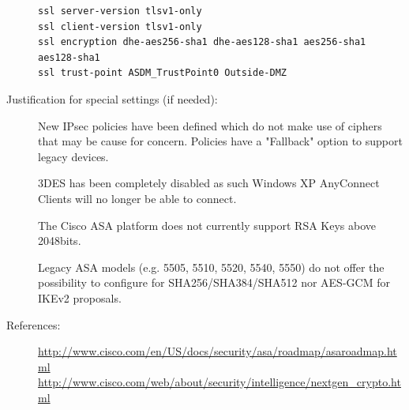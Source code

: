 \begin{description}
\begin{lstlisting}[breaklines]
ssl server-version tlsv1-only
ssl client-version tlsv1-only
ssl encryption dhe-aes256-sha1 dhe-aes128-sha1 aes256-sha1 aes128-sha1
ssl trust-point ASDM_TrustPoint0 Outside-DMZ
\end{lstlisting}

\item[Justification for special settings (if needed):] \mbox{}
New IPsec policies have been defined which do not make use of ciphers that may be cause for concern. Policies have a "Fallback" option to support legacy devices.

3DES has been completely disabled as such Windows XP AnyConnect Clients will no longer be able to connect.

The Cisco ASA platform does not currently support RSA Keys above 2048bits.

Legacy ASA models (e.g. 5505, 5510, 5520, 5540, 5550) do not offer the possibility to configure for SHA256/SHA384/SHA512 nor AES-GCM for IKEv2 proposals.

\item[References:] 
\url{http://www.cisco.com/en/US/docs/security/asa/roadmap/asaroadmap.html}\\
\url{http://www.cisco.com/web/about/security/intelligence/nextgen_crypto.html}



\end{description}












